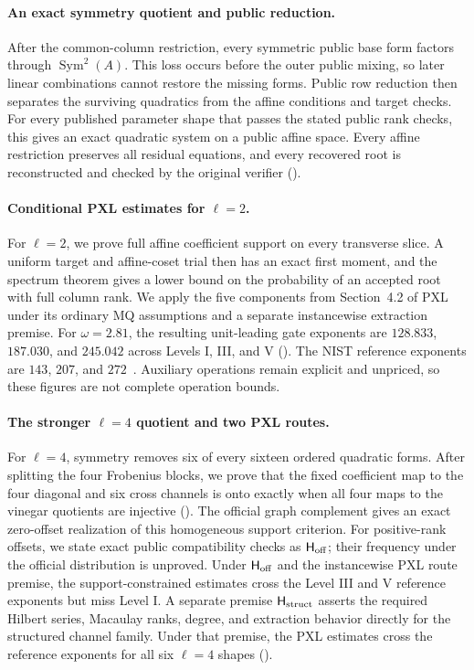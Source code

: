 \documentclass[11pt]{article}
\newcommand{\Sym}{\operatorname{Sym}}
\begin{document}
\paragraph{An exact symmetry quotient and public reduction.}
After the common-column restriction, every symmetric public base form factors
through $\Sym^2(A)$.  This loss occurs before the outer public mixing, so later
linear combinations cannot restore the missing forms.  Public row reduction
then separates the surviving quadratics from the affine conditions and target
checks.  For every published parameter shape that passes the stated public
rank checks, this gives an exact quadratic system on a public affine space.
Every affine restriction preserves all residual equations, and every
recovered root is reconstructed and checked by the original verifier
().

\paragraph{Conditional PXL estimates for $\ell=2$.}
For $\ell=2$, we prove full affine coefficient support on every transverse
slice.  A uniform target and affine-coset trial then has an exact first moment,
and the spectrum theorem gives a lower bound on the probability of an
accepted root with full column rank.  We apply the five components from
Section~4.2 of PXL under its ordinary MQ assumptions and a separate
instancewise extraction premise.  For $\omega=2.81$, the resulting
unit-leading gate exponents are $128.833$, $187.030$, and $245.042$ across
Levels I, III, and V ().  The NIST reference
exponents are $143$, $207$, and $272$~\cite{NISTSecurityCriteria2026}.
Auxiliary operations remain explicit and unpriced, so these figures are not
complete operation bounds.

\paragraph{The stronger $\ell=4$ quotient and two PXL routes.}
For $\ell=4$, symmetry removes six of every sixteen ordered quadratic forms.
After splitting the four Frobenius blocks, we prove that the fixed coefficient
map to the four diagonal and six cross channels is onto exactly when all four
maps to the vinegar quotients are injective
().  The official graph complement gives
an exact zero-offset realization of this homogeneous support criterion.  For
positive-rank offsets, we state exact public compatibility checks as
$\mathsf H_{\rm off}$; their frequency under the official distribution is
unproved.  Under $\mathsf H_{\rm off}$ and the instancewise PXL route premise,
the support-constrained estimates cross the Level III and V reference
exponents but miss Level I.  A separate premise $\mathsf H_{\rm struct}$
asserts the required Hilbert series, Macaulay ranks, degree, and extraction
behavior directly for the structured channel family.  Under that premise,
the PXL estimates cross the reference exponents for all six $\ell=4$ shapes
().
\end{document}
